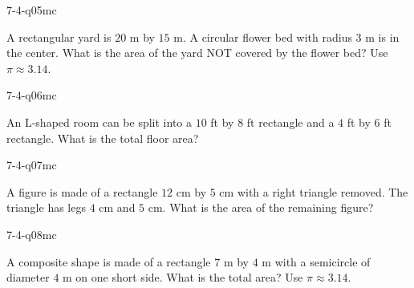 \begin{practiceQuestion}{7-4-q05}{mc}
\begin{questionText}
A rectangular yard is $20$ m by $15$ m. A circular flower bed with radius $3$ m is in the center. What is the area of the yard NOT covered by the flower bed? Use $\pi \approx 3.14$.
\end{questionText}
\end{practiceQuestion}

\begin{practiceQuestion}{7-4-q06}{mc}
\begin{questionText}
An L-shaped room can be split into a $10$ ft by $8$ ft rectangle and a $4$ ft by $6$ ft rectangle. What is the total floor area?
\end{questionText}
\end{practiceQuestion}

\begin{practiceQuestion}{7-4-q07}{mc}
\begin{questionText}
A figure is made of a rectangle $12$ cm by $5$ cm with a right triangle removed. The triangle has legs $4$ cm and $5$ cm. What is the area of the remaining figure?
\end{questionText}
\end{practiceQuestion}

\begin{practiceQuestion}{7-4-q08}{mc}
\begin{questionText}
A composite shape is made of a rectangle $7$ m by $4$ m with a semicircle of diameter $4$ m on one short side. What is the total area? Use $\pi \approx 3.14$.
\end{questionText}
\end{practiceQuestion}

